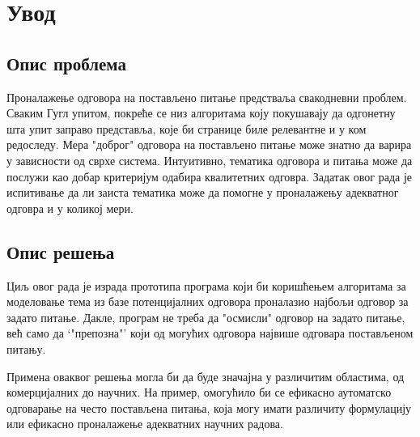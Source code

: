 \chapter{Увод}


\section{Опис проблема}

Проналажење одговора на постављено питање предстваља  свакодневни проблем. Сваким Гугл упитом, покреће се низ алгоритама коју покушавају да одгонетну шта упит заправо представља, које би странице биле релевантне и у ком редоследу. 
Мера "доброг" одговора на постављено питање може знатно да варира у зависности од сврхе система. Интуитивно, тематика одговора и питања може да послужи као добар критеријум одабира квалитетних одговра. Задатак овог рада је испитивање да ли заиста тематика може да помогне у проналажењу адекватног одговра и у коликој мери.



\section{Опис решења}


Циљ овог рада је израда прототипа програма који би коришћењем алгоритама за моделовање тема из базе потенцијалних одговора проналазио најбољи одговор за задато питање. Дакле, програм не треба да "осмисли" одговор на задато питање, већ само да `"препозна"' који од могућих одговора највише одговара постављеном питању. 

Примена оваквог решења могла би да буде значајна у различитим областима, од комерцијалних до научних. На пример, омогућило би се ефикасно аутоматско одговарање на често постављена питања, која могу имати различиту формулацију или ефикасно проналажење адекватних научних радова. 


